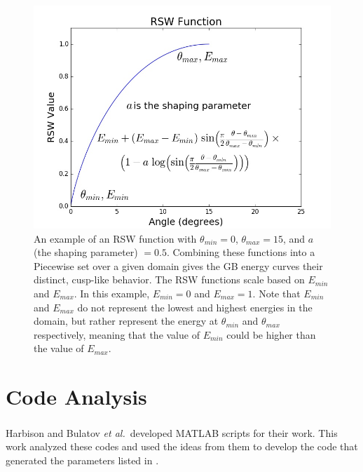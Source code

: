 \documentclass[12pt]{report}
\begin{document}
\begin{figure}[ht!]
 \centering
 \includegraphics[scale=0.5]{Images/rsw}
 \caption[The general form of an RSW function.]{\label{fig:RSW}An example of an RSW function with $\theta_{min} = 0$\textdegree{}, $\theta_{max} = 15$\textdegree{}, and $a$ (the shaping parameter) $= 0.5$.  Combining these functions into a Piecewise set over a given domain gives the GB energy curves their distinct, cusp-like behavior.  The RSW functions scale based on $E_{min}$ and $E_{max}$.  In this example, $E_{min} = 0$ and $E_{max} = 1$. Note that $E_{min}$ and $E_{max}$ do not represent the lowest and highest energies in the domain, but rather represent the energy at $\theta_{min}$ and $\theta_{max}$ respectively, meaning that the value of $E_{min}$ could be higher than the value of $E_{max}$.}
\end{figure}



\section{Code Analysis\label{methods:code}}
Harbison\cite{harbison2015} and Bulatov \emph{et al.}\cite{bulatov2014}\ developed MATLAB\textsuperscript{\textregistered} scripts for their work.  This work analyzed these codes and used the ideas from them to develop the code that generated the parameters listed in .
\end{document}
